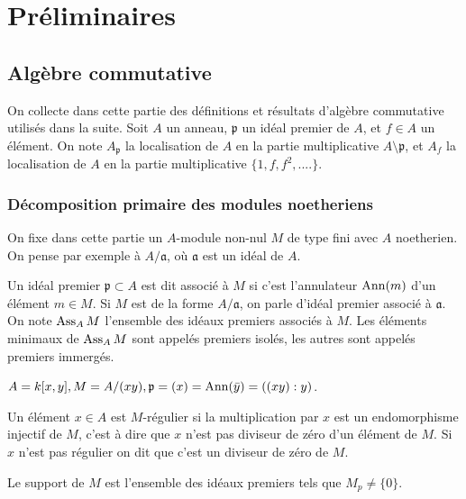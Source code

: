 \chapter{Préliminaires}

\section{Algèbre commutative}

On collecte dans cette partie des définitions et résultats d'algèbre commutative utilisés dans la suite. Soit $A$ un anneau, $\mathfrak{p}$ un idéal premier de $A$, et $f\in A$ un élément. On note $A_\mathfrak{p}$ la localisation de $A$ en la partie multiplicative $A\setminus \mathfrak{p}$, et $A_f$ la localisation de $A$ en la partie multiplicative $\lbrace 1, f, f^2, ....\rbrace$.


\subsection{Décomposition primaire des modules noetheriens}

On fixe dans cette partie un $A$-module non-nul $M$ de type fini avec $A$ noetherien. On pense par exemple à $A/\mathfrak{a}$, où $\mathfrak{a}$ est un idéal de $A$.

\begin{defn}
Un idéal premier $\mathfrak{p}\subset A$ est dit associé à $M$ si c'est l'annulateur $\operatorname{Ann}(m)$ d'un élément $m\in M$. Si $M$ est de la forme $A/\mathfrak{a}$, on parle d'idéal premier associé à $\mathfrak{a}$. On note $\operatorname{Ass}_AM$ l'ensemble des idéaux premiers associés à $M$. Les éléments minimaux de $\operatorname{Ass}_AM$ sont appelés premiers isolés, les autres sont appelés premiers immergés.
\end{defn}

\begin{ex}
$A=k[x,y], M=A/(xy),\mathfrak{p}=(x)=\operatorname{Ann}(\bar{y})=((xy):y)$.
\end{ex}

\begin{defn}
Un élément $x\in A$ est $M$-régulier si la multiplication par $x$ est un endomorphisme injectif de $M$, c'est à dire que $x$ n'est pas diviseur de zéro d'un élément de $M$. Si $x$ n'est pas régulier on dit que c'est un diviseur de zéro de $M$.
\end{defn}

\begin{defn}
Le support de $M$ est l'ensemble des idéaux premiers tels que $M_p\neq \lbrace 0\rbrace$.
\end{defn}

